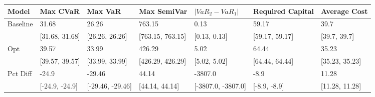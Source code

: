 \begin{tabular}{lllllll}
\toprule
   Model &       Max CVaR &          Max VaR &      Max SemiVar &  $|VaR_2 - VaR_1|$ & Required Capital &   Average Cost \\
\midrule
Baseline &          31.68 &            26.26 &           763.15 &               0.13 &            59.17 &           39.7 \\
         & [31.68, 31.68] &   [26.26, 26.26] & [763.15, 763.15] &       [0.13, 0.13] &   [59.17, 59.17] &   [39.7, 39.7] \\
     Opt &          39.57 &            33.99 &           426.29 &               5.02 &            64.44 &          35.23 \\
         & [39.57, 39.57] &   [33.99, 33.99] & [426.29, 426.29] &       [5.02, 5.02] &   [64.44, 64.44] & [35.23, 35.23] \\
Pct Diff &          -24.9 &           -29.46 &            44.14 &            -3807.0 &             -8.9 &          11.28 \\
         & [-24.9, -24.9] & [-29.46, -29.46] &   [44.14, 44.14] & [-3807.0, -3807.0] &     [-8.9, -8.9] & [11.28, 11.28] \\
\bottomrule
\end{tabular}
